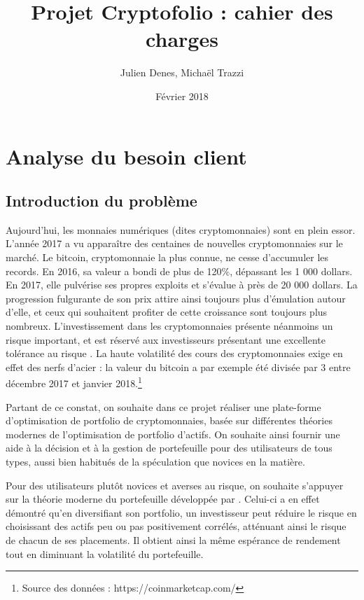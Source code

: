 \documentclass[a4paper]{article}
\title{Projet Cryptofolio : cahier des charges}
\author[]{Julien Denes, Michaël Trazzi}
\affil[]{Faculté des Sciences et Ingénierie -- Sorbonne Université}
\date{Février 2018}
\begin{document}
\maketitle

\section{Analyse du besoin client}

\subsection{Introduction du problème}

Aujourd’hui, les monnaies numériques (dites cryptomonnaies) sont en plein essor. L'année 2017 a vu apparaître des centaines de nouvelles cryptomonnaies sur le marché. Le bitcoin, cryptomonnaie la plus connue, ne cesse d’accumuler les records. En 2016, sa valeur a bondi de plus de 120\%, dépassant les 1 000 dollars. En 2017, elle pulvérise ses propres exploits et s'évalue à près de 20 000 dollars. La progression fulgurante de son prix attire ainsi toujours plus d'émulation autour d'elle, et ceux qui souhaitent profiter de cette croissance sont toujours plus nombreux. L’investissement dans les cryptomonnaies présente néanmoins un risque important, et est réservé aux investisseurs présentant une excellente tolérance au risque \cite{Elendner2018}. La haute volatilité des cours des cryptomonnaies exige en effet des nerfs d’acier : la valeur du bitcoin a par exemple été divisée par 3 entre décembre 2017 et janvier 2018.\footnote{Source des données : https://coinmarketcap.com/}

Partant de ce constat, on souhaite dans ce projet réaliser une plate-forme d’optimisation de portfolio de cryptomonnaies, basée sur différentes théories modernes de l'optimisation de portfolio d'actifs. On souhaite ainsi fournir une aide à la décision et à la gestion de portefeuille pour des utilisateurs de tous types, aussi bien habitués de la spéculation que novices en la matière.

Pour des utilisateurs plutôt novices et averses au risque, on souhaite s'appuyer sur la théorie moderne du portefeuille développée par \citet{Markovitz1952}. Celui-ci a en effet démontré qu'en diversifiant son portfolio, un investisseur peut réduire le risque en choisissant des actifs peu ou pas positivement corrélés, atténuant ainsi le risque de chacun de ses placements. Il obtient ainsi la même espérance de rendement tout en diminuant la volatilité du portefeuille.
\end{document}
